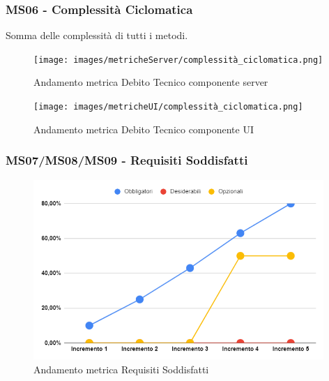 \subsubsection{MS06 - Complessità Ciclomatica}
Somma delle complessità di tutti i metodi.
\begin{figure}[H]
	\centering
	\texttt{[image: images/metricheServer/complessità\_ciclomatica.png]}
	\caption{Andamento metrica Debito Tecnico componente server}
\end{figure}
\begin{figure}[H]
	\centering
	\texttt{[image: images/metricheUI/complessità\_ciclomatica.png]}
	\caption{Andamento metrica Debito Tecnico componente UI}
\end{figure}

\subsubsection{MS07/MS08/MS09 - Requisiti Soddisfatti}
\begin{figure}[H]
	\centering
	\includegraphics[width=11cm]{images/requisiti_soddisfatti.png}
	\caption{Andamento metrica Requisiti Soddisfatti}
\end{figure}
